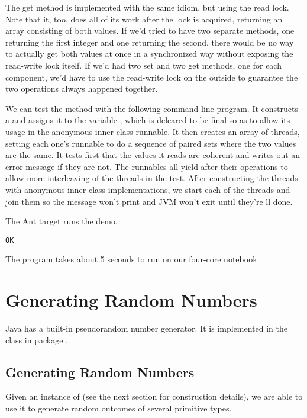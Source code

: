 The get method is implemented with the same idiom, but using the
read lock.
%
%
Note that it, too, does all of its work after the lock is acquired,
returning an array consisting of both values.  If we'd tried to have
two separate methods, one returning the first integer and one
returning the second, there would be no way to actually get both
values at once in a synchronized way without exposing the read-write
lock itself.  If we'd had two set and two get methods, one for each
component, we'd have to use the read-write lock on the outside to
guarantee the two operations always happened together.  

We can test the method with the following command-line program.
%
%
It constructs a  and assigns it to the variable
, which is delcared to be final so as to allow its usage in
the anonymous inner class runnable.  It then creates an array of threads,
setting each one's runnable to do a sequence of paired sets where the
two values are the same.  It tests first that the values it reads are
coherent and writes out an error message if they are not.  The runnables
all yield after their operations to allow more interleaving of the threads
in the test.  After constructing the threads with anonymous inner class
 implementations, we start each of the threads and join them
so the message won't print and JVM won't exit until they're ll done.

The Ant target  runs the demo.  
%
\begin{verbatim}
OK
\end{verbatim}
%
The program takes about 5 seconds to run on our four-core notebook.


\section{Generating Random Numbers}\label{appendix:java-random}

Java has a built-in pseudorandom number generator.  It is implemented
in the class  in package .  

\subsection{Generating Random Numbers}

Given an instance of  (see the next section for
construction details), we are able to use it to generate random
outcomes of several primitive types. 

